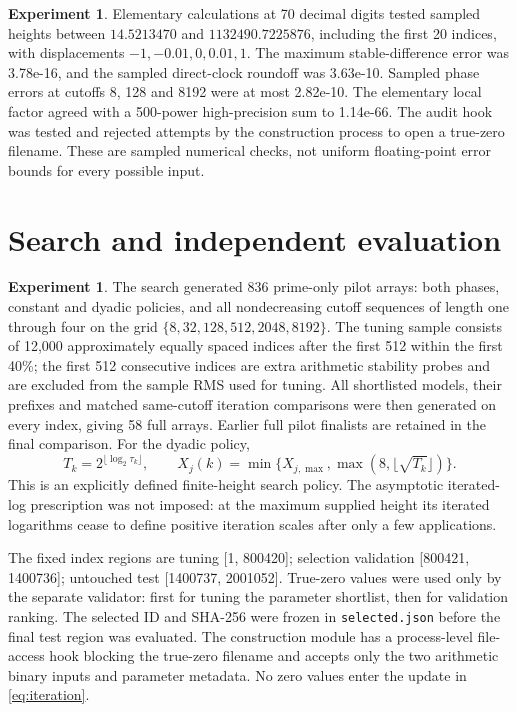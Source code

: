 \documentclass[11pt]{amsart}
\numberwithin{equation}{section}
\theoremstyle{definition}\newtheorem{definition}[proposition]{Definition}
\newtheorem{experiment}[proposition]{Experiment}
\theoremstyle{remark}\newtheorem{remark}[proposition]{Remark}
\begin{document}
\begin{experiment}\label{exp:precision}
Elementary calculations at 70 decimal digits tested sampled heights between
$14.5213470$ and $1132490.7225876$, including the first 20 indices,
with displacements $-1,-0.01,0,0.01,1$.
The maximum stable-difference error was 3.78e-16, and the sampled direct-clock
roundoff was 3.63e-10. Sampled phase errors at cutoffs 8, 128 and 8192
were at most 2.82e-10. The elementary local factor agreed with a
500-power high-precision sum to 1.14e-66.
The audit hook was tested and rejected attempts by the construction process
to open a true-zero filename. These are sampled numerical checks, not
uniform floating-point error bounds for every possible input.
\end{experiment}

\section{Search and independent evaluation}\label{sec:protocol}
\begin{experiment}\label{exp:search}
The search generated 836 prime-only pilot arrays: both phases,
constant and dyadic policies, and all nondecreasing cutoff sequences of
length one through four on the grid
$\{8,\allowbreak32,\allowbreak128,\allowbreak512,\allowbreak2048,\allowbreak8192\}$.
The tuning sample consists of 12,000 approximately equally spaced indices
after the first 512 within the first 40\%; the first 512 consecutive
indices are extra arithmetic stability probes and are excluded from the
sample RMS used for tuning.
All shortlisted models, their prefixes and matched same-cutoff iteration
comparisons were then generated on every index, giving 58 full arrays.
Earlier full pilot finalists are retained in the final comparison.
For the dyadic policy,
\begin{equation}
T_k=2^{\lfloor\log_2\tau_k\rfloor},\qquad
X_j(k)=\min\{X_{j,\max},\max(8,\lfloor\sqrt{T_k}\rfloor)\}.
\label{eq:dyadic}
\end{equation}
This is an explicitly defined finite-height search policy. The asymptotic
iterated-log prescription was not imposed: at the maximum supplied height
its iterated logarithms cease to define positive iteration scales after
only a few applications.
\end{experiment}

The fixed index regions are tuning [1, 800420]; selection validation
[800421, 1400736]; untouched test [1400737, 2001052]. True-zero values were used only
by the separate validator: first for tuning the parameter shortlist,
then for validation ranking. The selected ID and SHA-256 were frozen in
\texttt{selected.json} before the final test region was evaluated.
The construction module has a process-level file-access hook blocking
the true-zero filename and accepts only the two arithmetic binary inputs
and parameter metadata. No zero values enter the update in \eqref{eq:iteration}.
\end{document}
